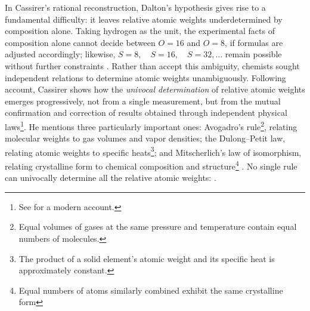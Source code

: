\documentclass[submitted,12pt]{article}
\begin{document}
In Cassirer's rational reconstruction, Dalton's hypothesis gives rise to a fundamental difficulty: it leaves relative atomic weights underdetermined by composition alone. Taking hydrogen as the unit, the experimental facts of composition alone cannot decide between $O=16$ and $O=8$, if formulas are adjusted accordingly; likewise, $S=8, \quad S=16, \quad S=32, \ldots$ remain possible without further constraints . Rather than accept this ambiguity, chemists sought independent relations to determine atomic weights unambiguously. Following  account, Cassirer shows how the \emph{univocal determination} of relative atomic weights emerges progressively, not from a single measurement, but from the mutual confirmation and correction of results obtained through independent physical laws\footnote{See \citet{Norton2024} for a modern account.}. He mentions three particularly important ones: Avogadro's rule\footnote{Equal volumes of gases at the same pressure and temperature contain equal numbers of molecules.}, relating molecular weights to gas volumes and vapor densities; the Dulong--Petit law, relating atomic weights to specific heats\footnote{The product of a solid element's atomic weight and its specific heat is approximately constant.}; and Mitscherlich's law of isomorphism, relating crystalline form to chemical composition and structure\footnote{Equal numbers of atoms similarly combined exhibit the same crystalline form} . No single rule can univocally determine all the relative atomic weights:  .

\end{document}
